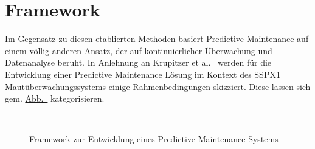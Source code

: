 \chapter{Framework}
Im Gegensatz zu diesen etablierten Methoden basiert Predictive Maintenance auf einem völlig anderen Ansatz, der auf kontinuierlicher
Überwachung und Datenanalyse beruht. In Anlehnung an Krupitzer et al.~\cite{Krupitzer2020} werden für die Entwicklung einer Predictive
Maintenance Lösung im Kontext des SSPX1 Mautüberwachungssystems einige Rahmenbedingungen skizziert. Diese lassen sich gem.
\hyperref[fig:pdm_framework]{Abb.~} kategorisieren.

\begin{figure}[H]
    \centering
    \caption{Framework zur Entwicklung eines Predictive Maintenance Systems}
~\label{fig:pdm_framework}
\end{figure}

